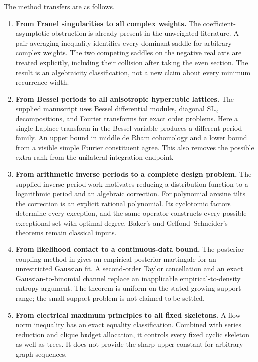\documentclass[11pt,a4paper]{article}
\theoremstyle{definition}
\theoremstyle{remark}
\numberwithin{equation}{section}
\begin{document}
The method transfers are as follows.
\begin{enumerate}[leftmargin=*,itemsep=5pt]
\item \textbf{From Franel singularities to all complex weights.}
The coefficient-asymptotic obstruction is already present in the unweighted
literature. A pair-averaging inequality identifies every dominant saddle
for arbitrary complex weights. The two competing saddles on the negative
real axis are treated explicitly, including their collision after taking
the even section. The result is an algebraicity classification, not a
new claim about every minimum recurrence width.

\item \textbf{From Bessel periods to all anisotropic hypercubic lattices.}
The supplied manuscript \cite{p5:Keio032} uses Bessel differential modules,
diagonal $\mathrm{SL}_2$ decompositions, and Fourier transforms for exact
order problems. Here a single Laplace transform in the Bessel variable
produces a different period family. An upper bound in middle de Rham
cohomology and a lower bound from a visible simple Fourier constituent
agree. This also removes the possible extra rank from the unilateral
integration endpoint.

\item \textbf{From arithmetic inverse periods to a complete design problem.}
The supplied inverse-period work \cite{p5:Keio024} motivates reducing a
distribution function to a logarithmic period and an algebraic correction.
For polynomial arcsine tilts the correction is an explicit rational
polynomial. Its cyclotomic factors determine every exception, and the
same operator constructs every possible exceptional set with optimal
degree. Baker's and Gelfond--Schneider's theorems remain classical inputs.

\item \textbf{From likelihood contact to a continuous-data bound.}
The posterior coupling method in \cite{p4:Keio029,p4:KeioEntropy2026} gives
an empirical-posterior martingale for an unrestricted Gaussian fit.
A second-order Taylor cancellation and an exact Gaussian-to-binomial
channel replace an inapplicable empirical-to-density entropy argument.
The theorem is uniform on the stated growing-support range; the
small-support problem is not claimed to be settled.

\item \textbf{From electrical maximum principles to all fixed skeletons.}
A flow norm inequality has an exact equality classification. Combined
with series reduction and clique budget allocation, it controls every
fixed cyclic skeleton as well as trees. It does not provide the sharp
upper constant for arbitrary graph sequences.
\end{enumerate}
\end{document}
